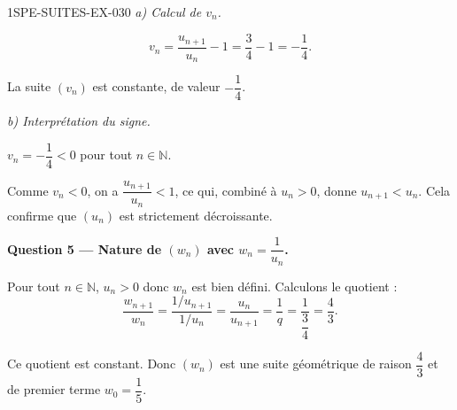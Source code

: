 \begin{corrige}{1SPE-SUITES-EX-030}
\textit{a) Calcul de $v_n$.}

\[
  v_n = \frac{u_{n+1}}{u_n} - 1 = \frac{3}{4} - 1 = -\frac{1}{4}.
\]

La suite $(v_n)$ est constante, de valeur $-\dfrac{1}{4}$.

\textit{b) Interprétation du signe.}

$v_n = -\dfrac{1}{4} < 0$ pour tout $n \in \mathbb{N}$.


Comme $v_n < 0$, on a $\dfrac{u_{n+1}}{u_n} < 1$, ce qui, combiné à $u_n > 0$, donne $u_{n+1} < u_n$. Cela confirme que $(u_n)$ est strictement décroissante.

\medskip
\textbf{Question 5 — Nature de $(w_n)$ avec $w_n = \dfrac{1}{u_n}$.}

Pour tout $n \in \mathbb{N}$, $u_n > 0$ donc $w_n$ est bien défini. Calculons le quotient :
\[
  \frac{w_{n+1}}{w_n} = \frac{1/u_{n+1}}{1/u_n} = \frac{u_n}{u_{n+1}} = \frac{1}{q} = \frac{1}{\dfrac{3}{4}} = \frac{4}{3}.
\]


Ce quotient est constant. Donc $(w_n)$ est une suite géométrique de raison $\dfrac{4}{3}$ et de premier terme $w_0 = \dfrac{1}{5}$.

\end{corrige}
